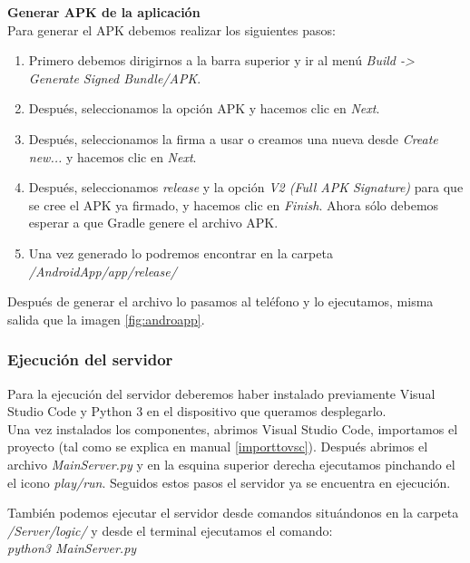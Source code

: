 \textbf{Generar APK de la aplicación}\\
Para generar el APK debemos realizar los siguientes pasos:
\begin{enumerate}
\item
	Primero debemos dirigirnos a la barra superior y ir al menú \textit{Build -> Generate Signed Bundle/APK}.
\item
	Después, seleccionamos la opción APK y hacemos clic en \textit{Next}.
\item
	Después, seleccionamos la firma a usar o creamos una nueva desde \textit{Create new...} y hacemos clic en \textit{Next}.
\item
	Después, seleccionamos \textit{release} y la opción \textit{V2 (Full APK Signature)} para que se cree el APK ya firmado, y hacemos clic en \textit{Finish}. Ahora sólo debemos esperar a que Gradle genere el archivo APK.
\item
	Una vez generado lo podremos encontrar en la carpeta \textit{/AndroidApp/app/release/}
\end{enumerate}

Después de generar el archivo lo pasamos al teléfono y lo ejecutamos, misma salida que la imagen \ref{fig:androapp}.

\subsubsection{Ejecución del servidor}

Para la ejecución del servidor deberemos haber instalado previamente Visual Studio Code y Python 3 en el dispositivo que queramos desplegarlo.\\
Una vez instalados los componentes, abrimos Visual Studio Code, importamos el proyecto (tal como se explica en manual \ref{importtovsc}).
Después abrimos el archivo \textit{MainServer.py} y en la esquina superior derecha ejecutamos pinchando el el icono \textit{play/run}. 
Seguidos estos pasos el servidor ya se encuentra en ejecución.

También podemos ejecutar el servidor desde comandos situándonos en la carpeta \textit{/Server/logic/} y desde el terminal ejecutamos el comando:\\
\textit{python3 MainServer.py}



